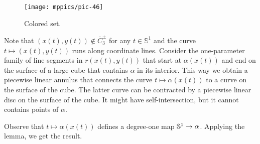 \begin{wrapfigure}{r}{24 mm}
\vskip-0mm
\centering
\texttt{[image: mppics/pic-46]}
\caption*{Colored set.}
\vskip0mm
\end{wrapfigure}

Note that $(x(t),y(t))\notin \bar C_3^\pm$ for any $t\in \mathbb{S}^1$ and the curve $t\mapsto(x(t),y(t))$ runs along coordinate lines.
Consider the one-parameter family of line segments in $r(x(t),y(t))$ that start at $\alpha(x(t))$ and end on the surface of a large cube that contains $\alpha$ in its interior.
This way we obtain a piecewise linear annulus that connects the curve $t\mapsto \alpha(x(t))$ to a curve on the surface of the cube.
The latter curve can be contracted by a piecewise linear disc on the surface of the cube.
It might have self-intersection, but it cannot contains points of $\alpha$.

Observe that $t\mapsto \alpha(x(t))$ defines a degree-one map $\mathbb{S}^1\z\to\alpha$.
Applying the lemma, we get the result.
\qeds





